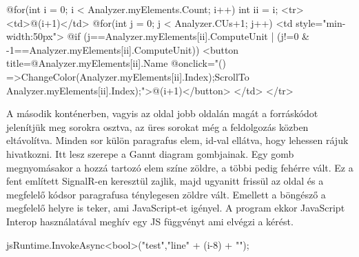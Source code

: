 \begin{cpp}
@for(int i = 0; i < Analyzer.myElements.Count; i++)
 {
   int ii = i;
   <tr>
      <td>@(i+1)</td>
      @for(int j = 0; j < Analyzer.CUs+1; j++)
        {
          <td style="min-width:50px">
          @if (j==Analyzer.myElements[ii].ComputeUnit | (j!=0 &
               -1==Analyzer.myElements[ii].ComputeUnit))
             {
                <button title=@Analyzer.myElements[ii].Name @onclick="()
                =>{ChangeColor(Analyzer.myElements[ii].Index);ScrollTo
                Analyzer.myElements[ii].Index);}">@(i+1)</button>
             }
          </td>
        }
   </tr>
 }
\end{cpp}


A második konténerben, vagyis az oldal jobb oldalán magát a forráskódot jelenítjük meg sorokra osztva, az üres sorokat még a feldolgozás közben eltávolítva. Minden sor külön paragrafus elem, id-val ellátva, hogy lehessen rájuk hivatkozni. Itt lesz szerepe a Gannt diagram gombjainak. Egy gomb megnyomásakor a hozzá tartozó elem színe zöldre, a többi pedig fehérre vált. Ez a fent említett SignalR-en keresztül zajlik, majd ugyanitt frissül az oldal és a megfelelő kódsor paragrafusa ténylegesen zöldre vált. Emellett a böngésző a megfelelő helyre is teker, ami JavaScript-et igényel. A program ekkor JavaScript Interop használatával meghív egy JS függvényt ami elvégzi a kérést.

\begin{cpp}
jsRuntime.InvokeAsync<bool>("test","line{" + (i-8) + "}");
\end{cpp}




